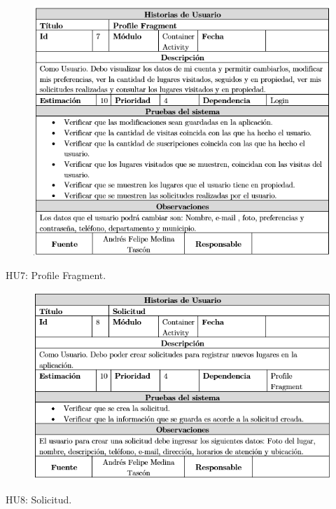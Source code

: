 \documentclass[12pt,letterpaper,openany]{book}
\begin{document}
\begin{table}[H]
\begin{center}
\begin{figure}[H]
\begin{center}
\includegraphics[width=13cm]{./imagenes/HU/HU7}
\end{center}
\end{figure}
\end{center}
\caption{HU7: Profile Fragment.}
\end{table}

\begin{table}[H]
\begin{center}
\begin{figure}[H]
\begin{center}
\includegraphics[width=13cm]{./imagenes/HU/HU8}
\end{center}
\end{figure}
\end{center}
\caption{HU8: Solicitud.}
\end{table}
\end{document}
